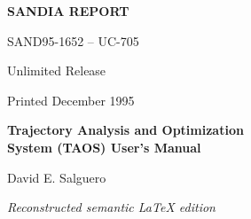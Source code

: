 \begin{titlepage}
\raggedright
{\bfseries SANDIA REPORT\par}
SAND95-1652 -- UC-705\par
Unlimited Release\par
Printed December 1995\par
\vspace{2.5cm}
{\Huge\bfseries Trajectory Analysis and Optimization\\System (TAOS) User's Manual\par}
\vspace{1.5cm}
{\Large David E. Salguero\par}
\vfill
\textit{Reconstructed semantic LaTeX edition}\par
\end{titlepage}
